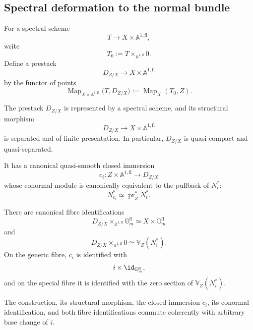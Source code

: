 \subsection{Spectral deformation to the normal bundle}

\begin{construction}
\label{constr:spectral-deformation-prestack}
For a spectral scheme
\[
    T\longrightarrow X\times\mathbb A^{1,\mathrm{fl}},
\]
write
\[
    T_0
    :=
    T\times_{\mathbb A^{1,\mathrm{fl}}}0.
\]
Define a prestack
\[
    D_{Z/X}
    \longrightarrow
    X\times\mathbb A^{1,\mathrm{fl}}
\]
by the functor of points
\[
    \operatorname{Map}_{X\times\mathbb A^{1,\mathrm{fl}}}
    \bigl(
      T,
      D_{Z/X}
    \bigr)
    :=
    \operatorname{Map}_X(T_0,Z).
\]
\end{construction}

\begin{theorem}
\label{thm:spectral-deformation-normal-bundle}
The prestack \(D_{Z/X}\) is represented by a spectral scheme, and its
structural morphism
\[
    D_{Z/X}
    \longrightarrow
    X\times\mathbb A^{1,\mathrm{fl}}
\]
is separated and of finite presentation.  In particular,
\(D_{Z/X}\) is quasi-compact and quasi-separated.

It has a canonical quasi-smooth closed immersion
\[
    c_i:
    Z\times\mathbb A^{1,\mathrm{fl}}
    \longrightarrow
    D_{Z/X}
\]
whose conormal module is canonically equivalent to the pullback of
\(N_i^*\):
\[
    N^*_{c_i}
    \simeq
    \operatorname{pr}_Z^*N_i^*.
\]

There are canonical fibre identifications
\[
    D_{Z/X}
    \times_{\mathbb A^{1,\mathrm{fl}}}
    \mathbb G_m^{\mathrm{fl}}
    \simeq
    X\times\mathbb G_m^{\mathrm{fl}}
\]
and
\[
    D_{Z/X}
    \times_{\mathbb A^{1,\mathrm{fl}}}0
    \simeq
    \mathbb V_Z(N_i^*).
\]
On the generic fibre, \(c_i\) is identified with
\[
    i\times\id_{\mathbb G_m^{\mathrm{fl}}},
\]
and on the special fibre it is identified with the zero section of
\(\mathbb V_Z(N_i^*)\).

The construction, its structural morphism, the closed immersion \(c_i\),
its conormal identification, and both fibre identifications commute
coherently with arbitrary base change of \(i\).
\end{theorem}

